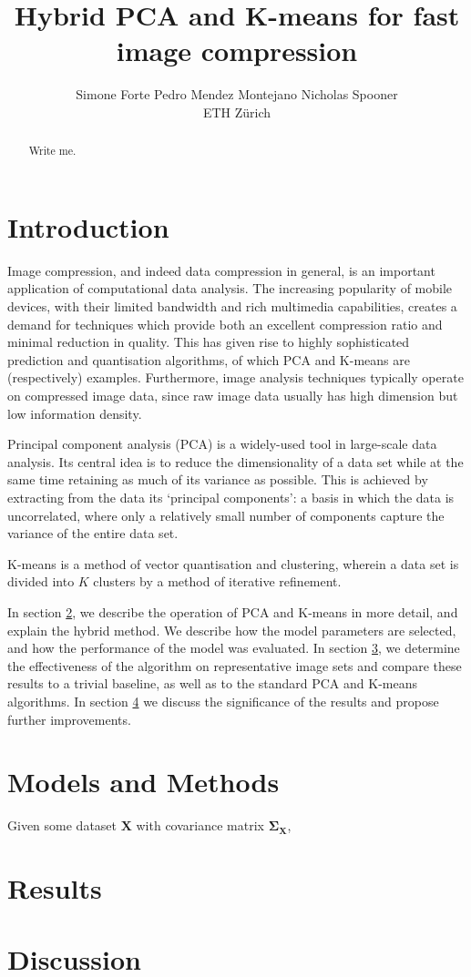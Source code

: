 \documentclass[10pt,conference,compsocconf]{IEEEtran}
\title{Hybrid PCA and K-means for fast image compression}
\author{Simone Forte \qquad Pedro Mendez Montejano \qquad Nicholas Spooner \\
		ETH Z\"urich}
\begin{document}
\maketitle

\begin{abstract}
Write me.
\end{abstract}

\section{Introduction}
Image compression, and indeed data compression in general, is an important application of computational data analysis. The increasing popularity of mobile devices, with their limited bandwidth and rich multimedia capabilities, creates a demand for techniques which provide both an excellent compression ratio and minimal reduction in quality. This has given rise to highly sophisticated prediction and quantisation algorithms, of which PCA and K-means are (respectively) examples. Furthermore, image analysis techniques typically operate on compressed image data, since raw image data usually has high dimension but low information density.

Principal component analysis (PCA) is a widely-used tool in large-scale data analysis. Its central idea is to reduce the dimensionality of a data set while at the same time retaining as much of its variance as possible. This is achieved by extracting from the data its `principal components': a basis in which the data is uncorrelated, where only a relatively small number of components capture the variance of the entire data set.

K-means is a method of vector quantisation and clustering, wherein a data set is divided into $K$ clusters by a method of iterative refinement.

In section \ref{models}, we describe the operation of PCA and K-means in more detail, and explain the hybrid method. We describe how the model parameters are selected, and how the performance of the model was evaluated. In section \ref{results}, we determine the effectiveness of the algorithm on representative image sets and compare these results to a trivial baseline, as well as to the standard PCA and K-means algorithms. In section \ref{discussion} we discuss the significance of the results and propose further improvements.

\section{Models and Methods}
\label{models}
Given some dataset $\mathbf{X}$ with covariance matrix $\mathbf{\Sigma_X}$, 

\section{Results}
\label{results}

\section{Discussion}
\label{discussion}
\end{document}
